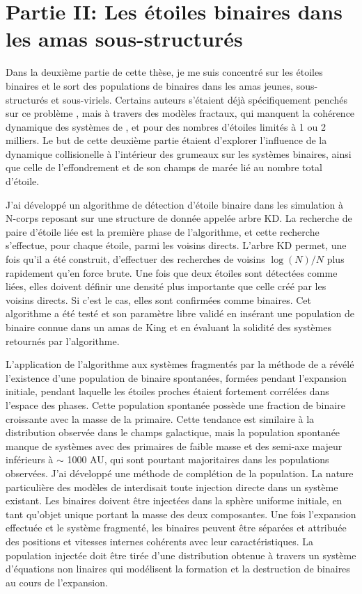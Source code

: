 \section{Partie II: Les étoiles binaires dans les amas sous-structurés}

Dans la deuxième partie de cette thèse, je me suis concentré sur les étoiles binaires et le sort des populations de binaires dans les amas jeunes, sous-structurés et sous-viriels. Certains auteurs s'étaient déjà spécifiquement penchés sur ce problème \citep{Parker2011}, mais à travers des modèles fractaux, qui manquent la cohérence dynamique des systèmes de \HubLem, et pour des nombres d'étoiles limités à 1 ou 2 milliers. Le but de cette deuxième partie étaient d'explorer l'influence de la dynamique collisionelle à l’intérieur des grumeaux sur les systèmes binaires, ainsi que celle de l'effondrement et de son champs de marée lié au nombre total d'étoile.

J'ai développé un algorithme de détection d'étoile binaire dans les simulation à N-corps reposant sur une structure de donnée appelée arbre KD. La recherche de paire d'étoile liée est la première phase de l'algorithme, et cette recherche s'effectue, pour chaque étoile, parmi les voisins directs. L'arbre KD permet, une fois qu'il a été construit, d'effectuer des recherches de voisins $\log(N)/N$ plus rapidement qu'en force brute. Une fois que deux étoiles sont détectées comme liées, elles doivent définir une densité plus importante que celle créé par les voisins directs. Si c'est le cas, elles sont confirmées comme binaires. Cet algorithme a été testé et son paramètre libre validé en insérant une population de binaire connue dans un amas de King et en évaluant la solidité des systèmes retournés par l'algorithme.

L'application de l'algorithme aux systèmes fragmentés par la méthode de \HubLem a révélé l'existence d'une population de binaire spontanées, formées pendant l'expansion initiale, pendant laquelle les étoiles proches étaient fortement corrélées dans l'espace des phases. Cette population spontanée possède une fraction de binaire croissante avec la masse de la primaire. Cette tendance est similaire à la distribution observée dans le champs galactique, mais la population spontanée manque de systèmes avec des primaires de faible masse et des semi-axe majeur inférieurs à $\sim$ 1000 AU, qui sont pourtant majoritaires dans les populations observées. J'ai développé une méthode de complétion de la population. La nature particulière des modèles de \HubLem interdisait toute injection directe dans un système existant. Les binaires doivent être injectées dans la sphère uniforme initiale, en tant qu'objet unique portant la masse des deux composantes. Une fois l'expansion effectuée et le système fragmenté, les binaires peuvent être séparées et attribuée des positions et vitesses internes cohérents avec leur caractéristiques. La population injectée doit être tirée d'une distribution obtenue à travers un système d'équations non linaires qui modélisent la formation et la destruction de binaires au cours de l'expansion.

